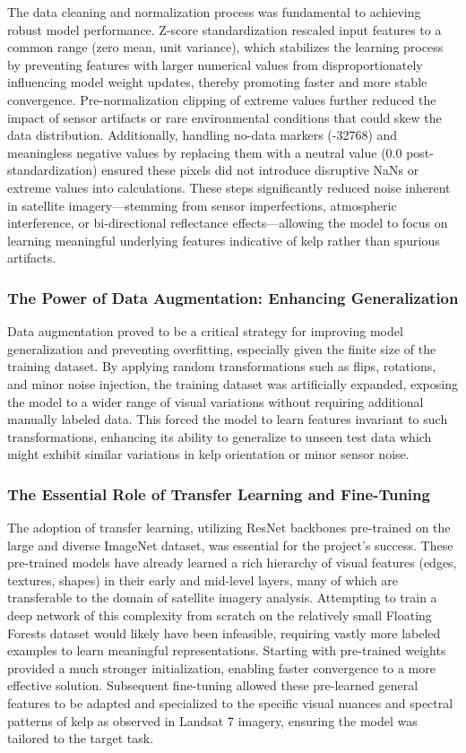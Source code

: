 \documentclass{article}
\begin{document}
The data cleaning and normalization process was fundamental to achieving robust model performance. Z-score standardization rescaled input features to a common range (zero mean, unit variance), which stabilizes the learning process by preventing features with larger numerical values from disproportionately influencing model weight updates, thereby promoting faster and more stable convergence. Pre-normalization clipping of extreme values further reduced the impact of sensor artifacts or rare environmental conditions that could skew the data distribution. Additionally, handling no-data markers (-32768) and meaningless negative values by replacing them with a neutral value (0.0 post-standardization) ensured these pixels did not introduce disruptive NaNs or extreme values into calculations. These steps significantly reduced noise inherent in satellite imagery—stemming from sensor imperfections, atmospheric interference, or bi-directional reflectance effects—allowing the model to focus on learning meaningful underlying features indicative of kelp rather than spurious artifacts.

\subsubsection{The Power of Data Augmentation: Enhancing Generalization}

Data augmentation proved to be a critical strategy for improving model generalization and preventing overfitting, especially given the finite size of the training dataset. By applying random transformations such as flips, rotations, and minor noise injection, the training dataset was artificially expanded, exposing the model to a wider range of visual variations without requiring additional manually labeled data. This forced the model to learn features invariant to such transformations, enhancing its ability to generalize to unseen test data which might exhibit similar variations in kelp orientation or minor sensor noise. 

\subsubsection{The Essential Role of Transfer Learning and Fine-Tuning}

The adoption of transfer learning, utilizing ResNet backbones pre-trained on the large and diverse ImageNet dataset, was essential for the project's success. These pre-trained models have already learned a rich hierarchy of visual features (edges, textures, shapes) in their early and mid-level layers, many of which are transferable to the domain of satellite imagery analysis. Attempting to train a deep network of this complexity from scratch on the relatively small Floating Forests dataset would likely have been infeasible, requiring vastly more labeled examples to learn meaningful representations. Starting with pre-trained weights provided a much stronger initialization, enabling faster convergence to a more effective solution. Subsequent fine-tuning allowed these pre-learned general features to be adapted and specialized to the specific visual nuances and spectral patterns of kelp as observed in Landsat 7 imagery, ensuring the model was tailored to the target task.
\end{document}
